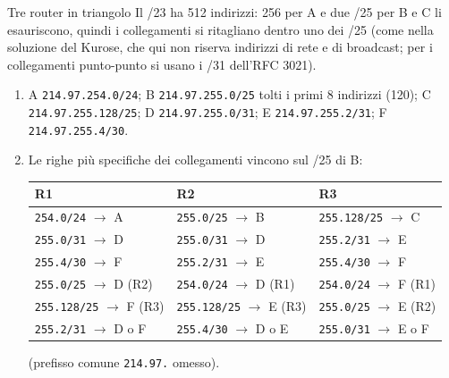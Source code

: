 \begin{esercizio}{Tre router in triangolo}
\svolgimento
Il /23 ha 512 indirizzi: 256 per A e due /25 per B e C li esauriscono, quindi i collegamenti si ritagliano dentro uno dei /25 (come nella
soluzione del Kurose, che qui non riserva indirizzi di rete e di broadcast; per i collegamenti punto-punto si usano i /31 dell'RFC 3021).
\begin{enumerate}[label=(\alph*)]
    \item A \texttt{214.97.254.0/24}; B \texttt{214.97.255.0/25} tolti i primi 8 indirizzi (120); C \texttt{214.97.255.128/25};
          D \texttt{214.97.255.0/31}; E \texttt{214.97.255.2/31}; F \texttt{214.97.255.4/30}.
    \item Le righe più specifiche dei collegamenti vincono sul /25 di B:
          \begin{center}
          \small
          \begin{tabular}{lll}
          \toprule
          \textbf{R1} & \textbf{R2} & \textbf{R3} \\
          \midrule
          \texttt{254.0/24} $\rightarrow$ A & \texttt{255.0/25} $\rightarrow$ B & \texttt{255.128/25} $\rightarrow$ C \\
          \texttt{255.0/31} $\rightarrow$ D & \texttt{255.0/31} $\rightarrow$ D & \texttt{255.2/31} $\rightarrow$ E \\
          \texttt{255.4/30} $\rightarrow$ F & \texttt{255.2/31} $\rightarrow$ E & \texttt{255.4/30} $\rightarrow$ F \\
          \texttt{255.0/25} $\rightarrow$ D (R2) & \texttt{254.0/24} $\rightarrow$ D (R1) & \texttt{254.0/24} $\rightarrow$ F (R1) \\
          \texttt{255.128/25} $\rightarrow$ F (R3) & \texttt{255.128/25} $\rightarrow$ E (R3) & \texttt{255.0/25} $\rightarrow$ E (R2) \\
          \texttt{255.2/31} $\rightarrow$ D o F & \texttt{255.4/30} $\rightarrow$ D o E & \texttt{255.0/31} $\rightarrow$ E o F \\
          \bottomrule
          \end{tabular}
          \end{center}
          (prefisso comune \texttt{214.97.} omesso).
\end{enumerate}
\end{esercizio}

